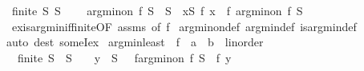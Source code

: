 \begin{isabellebody}
\ {\isachardoublequoteopen}finite\ S{\isachardoublequoteclose}\ {\isachardoublequoteopen}S\ {\isasymnoteq}\ {\isacharbraceleft}{\kern0pt}{\isacharbraceright}{\kern0pt}{\isachardoublequoteclose}\isanewline
{}\ \ {\isachardoublequoteopen}arg{\isacharunderscore}{\kern0pt}min{\isacharunderscore}{\kern0pt}on\ f\ S\ {\isasymin}\ S{\isachardoublequoteclose}\ \ {\isachardoublequoteopen}{\isasymnot}{\isacharparenleft}{\kern0pt}{\isasymexists}x{\isasymin}S{\isachardot}{\kern0pt}\ f\ x\ {\isacharless}{\kern0pt}\ f\ {\isacharparenleft}{\kern0pt}arg{\isacharunderscore}{\kern0pt}min{\isacharunderscore}{\kern0pt}on\ f\ S{\isacharparenright}{\kern0pt}{\isacharparenright}{\kern0pt}{\isachardoublequoteclose}\isanewline
%
\isadelimproof
%
\endisadelimproof
%
\isatagproof
{}\isamarkupfalse%
\ ex{\isacharunderscore}{\kern0pt}is{\isacharunderscore}{\kern0pt}arg{\isacharunderscore}{\kern0pt}min{\isacharunderscore}{\kern0pt}if{\isacharunderscore}{\kern0pt}finite{\isacharbrackleft}{\kern0pt}OF\ assms{\isacharcomma}{\kern0pt}\ of\ f{\isacharbrackright}{\kern0pt}\isanewline
{}\isamarkupfalse%
\ arg{\isacharunderscore}{\kern0pt}min{\isacharunderscore}{\kern0pt}on{\isacharunderscore}{\kern0pt}def\ arg{\isacharunderscore}{\kern0pt}min{\isacharunderscore}{\kern0pt}def\ is{\isacharunderscore}{\kern0pt}arg{\isacharunderscore}{\kern0pt}min{\isacharunderscore}{\kern0pt}def\isanewline
{}\isamarkupfalse%
{\isacharparenleft}{\kern0pt}auto\ dest{\isacharbang}{\kern0pt}{\isacharcolon}{\kern0pt}\ someI{\isacharunderscore}{\kern0pt}ex{\isacharparenright}{\kern0pt}%
\endisatagproof
{\isafoldproof}%
%
\isadelimproof
\isanewline
%
\endisadelimproof
\isanewline
{}\isamarkupfalse%
\ arg{\isacharunderscore}{\kern0pt}min{\isacharunderscore}{\kern0pt}least{\isacharcolon}{\kern0pt}\ \ f\ {\isacharcolon}{\kern0pt}{\isacharcolon}{\kern0pt}\ {\isachardoublequoteopen}{\isacharprime}{\kern0pt}a\ {\isasymRightarrow}\ {\isacharprime}{\kern0pt}b\ {\isacharcolon}{\kern0pt}{\isacharcolon}{\kern0pt}\ linorder{\isachardoublequoteclose}\isanewline
{}\ {\isachardoublequoteopen}{\isasymlbrakk}\ finite\ S{\isacharsemicolon}{\kern0pt}\ \ S\ {\isasymnoteq}\ {\isacharbraceleft}{\kern0pt}{\isacharbraceright}{\kern0pt}{\isacharsemicolon}{\kern0pt}\ \ y\ {\isasymin}\ S\ {\isasymrbrakk}\ {\isasymLongrightarrow}\ f{\isacharparenleft}{\kern0pt}arg{\isacharunderscore}{\kern0pt}min{\isacharunderscore}{\kern0pt}on\ f\ S{\isacharparenright}{\kern0pt}\ {\isasymle}\ f\ y{\isachardoublequoteclose}\isanewline

\end{isabellebody}

